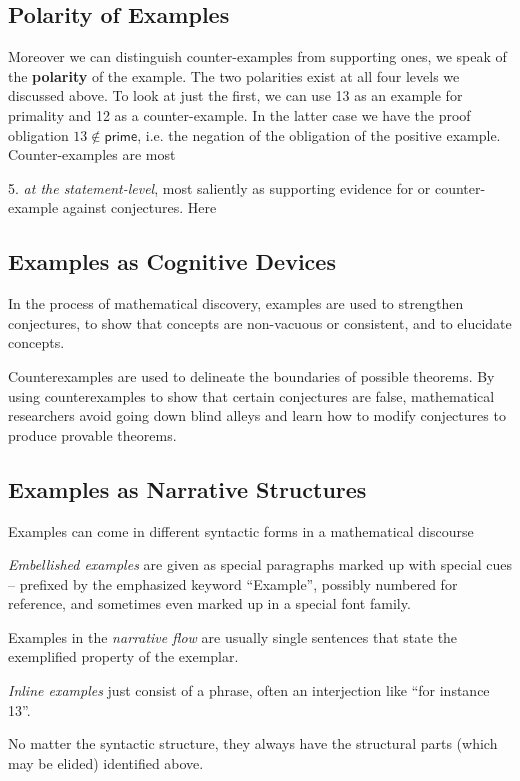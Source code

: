 \documentclass[11pt]{bluenote}
\def\cn#1{\mathsf{#1}}
\begin{document}
\subsection{Polarity of Examples}
Moreover we can distinguish counter-examples from supporting ones, we speak of the
\textbf{polarity} of the example. The two polarities exist at all four levels we discussed
above. To look at just the first, we can use 13 as an example for primality and 12 as a
counter-example. In the latter case we have the proof obligation $13\notin\cn{prime}$,
i.e. the negation of the obligation of the positive example. Counter-examples are most 
\begin{compactenum}
\item[5.] \emph{at the statement-level}, most saliently as supporting evidence for or
  counter-example against conjectures.  Here 
\end{compactenum}

\subsection{Examples as Cognitive Devices}
In the process of mathematical discovery, examples are used to strengthen conjectures, to
show that concepts are non-vacuous or consistent, and to elucidate concepts.

Counterexamples are used to delineate the boundaries of possible theorems. By using
counterexamples to show that certain conjectures are false, mathematical researchers avoid
going down blind alleys and learn how to modify conjectures to produce provable
theorems. 

\subsection{Examples as Narrative Structures}
Examples can come in different syntactic forms in a mathematical discourse
\begin{compactenum} 
\item \emph{Embellished examples} are given as
  special paragraphs marked up with special cues -- prefixed by the emphasized keyword
  ``Example'', possibly numbered for reference, and sometimes even marked up in a special
  font family.
\item Examples in the \emph{narrative flow} are usually single sentences that state the
  exemplified property of the exemplar.
\item \emph{Inline examples} just consist of a phrase, often an interjection like ``for
  instance 13''. 
\end{compactenum}
No matter the syntactic structure, they always have the structural parts (which may be
elided) identified above. 
\end{document}
